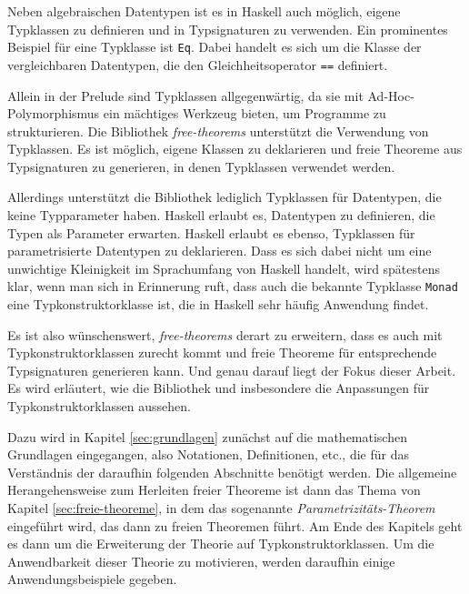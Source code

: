 
Neben algebraischen Datentypen ist es in Haskell auch möglich, eigene Typklassen zu definieren und in
Typsignaturen zu verwenden. Ein prominentes Beispiel für eine Typklasse ist \texttt{Eq}. Dabei handelt es sich um
die Klasse der vergleichbaren Datentypen, die den Gleichheitsoperator \texttt{==} definiert.

Allein in der Prelude sind Typklassen allgegenwärtig, da sie mit Ad-Hoc-Poly\-mor\-phis\-mus ein mächtiges Werkzeug bieten,
um Programme zu strukturieren. Die Bibliothek \textit{free-theorems} unterstützt die Verwendung von Typklassen. Es ist möglich, eigene
Klassen zu deklarieren und freie Theoreme aus Typsignaturen zu generieren, in denen Typklassen verwendet werden.

Allerdings unterstützt die Bibliothek lediglich Typklassen für Datentypen, die keine Typparameter haben. Haskell erlaubt es,
Datentypen zu definieren, die Typen als Parameter erwarten. Haskell erlaubt es ebenso, Typklassen für parametrisierte
Datentypen zu deklarieren. Dass es sich dabei nicht um eine unwichtige Kleinigkeit im Sprachumfang von Haskell handelt, wird spätestens klar, wenn man
sich in Erinnerung ruft, dass auch die bekannte Typklasse \texttt{Monad} eine Typkonstruktorklasse ist, die in Haskell sehr häufig
Anwendung findet.

Es ist also wünschenswert, \textit{free-theorems} derart zu erweitern, dass es auch mit Typkonstruktorklassen zurecht kommt und
freie Theoreme für entsprechende Typsignaturen generieren kann. Und genau darauf liegt der Fokus dieser Arbeit. Es wird
erläutert, wie die Bibliothek und insbesondere die Anpassungen für Typkonstruktorklassen aussehen.

Dazu wird in Kapitel \ref{sec:grundlagen} zunächst auf die mathematischen Grundlagen eingegangen, also Notationen, Definitionen,
etc., die für das Verständnis der daraufhin folgenden Abschnitte benötigt werden.
Die allgemeine Herangehensweise zum Herleiten freier Theoreme ist dann das Thema von Kapitel \ref{sec:freie-theoreme}, in dem
das sogenannte \textit{Parametrizitäts-Theorem} eingeführt wird, das dann zu freien Theoremen führt.
Am Ende des Kapitels geht es dann um die Erweiterung der Theorie auf Typkonstruktorklassen. Um die Anwendbarkeit dieser
Theorie zu motivieren, werden daraufhin einige Anwendungsbeispiele gegeben.


